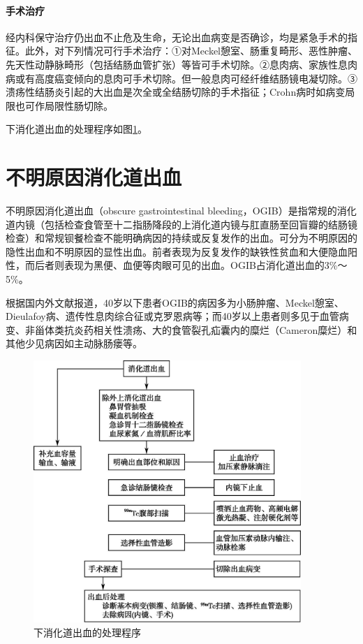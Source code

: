 \paragraph{手术治疗}

经内科保守治疗仍出血不止危及生命，无论出血病变是否确诊，均是紧急手术的指征。此外，对下列情况可行手术治疗：①对Meckel憩室、肠重复畸形、恶性肿瘤、先天性动静脉畸形（包括结肠血管扩张）等皆可手术切除。②息肉病、家族性息肉病或有高度癌变倾向的息肉可手术切除。但一般息肉可经纤维结肠镜电凝切除。③溃疡性结肠炎引起的大出血是次全或全结肠切除的手术指征；Crohn病时如病变局限也可作局限性肠切除。

下消化道出血的处理程序如图\ref{fig13-2}。

\protect\hypertarget{text00034.html}{}{}

\section{不明原因消化道出血}

不明原因消化道出血（obscure gastrointestinal
bleeding，OGIB）是指常规的消化道内镜（包括检查食管至十二指肠降段的上消化道内镜与肛直肠至回盲瓣的结肠镜检查）和常规钡餐检查不能明确病因的持续或反复发作的出血。可分为不明原因的隐性出血和不明原因的显性出血。前者表现为反复发作的缺铁性贫血和大便隐血阳性，而后者则表现为黑便、血便等肉眼可见的出血。OGIB占消化道出血的3\%～5\%。

根据国内外文献报道，40岁以下患者OGIB的病因多为小肠肿瘤、Meckel憩室、Dieulafoy病、遗传性息肉综合征或克罗恩病等；而40岁以上患者则多见于血管病变、非甾体类抗炎药相关性溃疡、大的食管裂孔疝囊内的糜烂（Cameron糜烂）和其他少见病因如主动脉肠瘘等。

\begin{figure}[!htbp]
 \centering
 \includegraphics[width=3.98958in,height=3.90625in]{./images/Image00059.jpg}
 \captionsetup{justification=centering}
 \caption{下消化道出血的处理程序}
 \label{fig13-2}
  \end{figure} 

